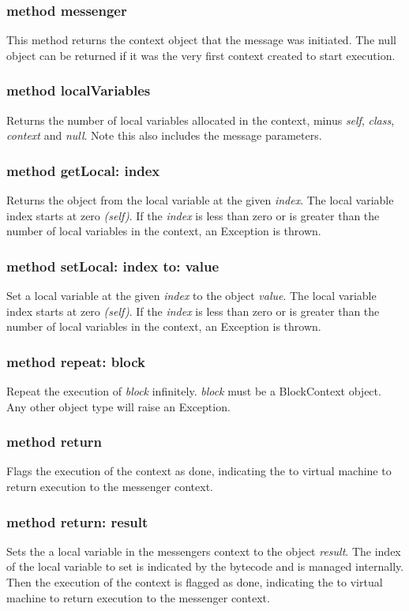 \subsubsection {method messenger}
This method returns the context object that the message was initiated. The null object can be returned if it was the very first context created to start execution.

\subsubsection {method localVariables}
Returns the number of local variables allocated in the context, minus \textit{self}, \textit{class}, \textit{context} and \textit{null}. Note this also includes the message parameters.

\subsubsection {method getLocal: index}
Returns the object from the local variable at the given \textit{index}. The local variable index starts at zero \textit{(self)}. If the \textit{index} is less than zero or is greater than the number of local variables in the context, an Exception is thrown.

\subsubsection {method setLocal: index to: value}
Set a local variable at the given \textit{index} to the object \textit{value}. The local variable index starts at zero \textit{(self)}. If the \textit{index} is less than zero or is greater than the number of local variables in the context, an Exception is thrown.

\subsubsection {method repeat: block}
Repeat the execution of \textit{block} infinitely. \textit{block} must be a BlockContext object. Any other object type will raise an Exception.

\subsubsection {method return}
Flags the execution of the context as done, indicating the to virtual machine to return execution to the messenger context.

\subsubsection {method return: result}
Sets the a local variable in the messengers context to the object \textit{result}. The index of the local variable to set is indicated by the bytecode and is managed internally. Then the execution of the context is flagged as done, indicating the to virtual machine to return execution to the messenger context.

